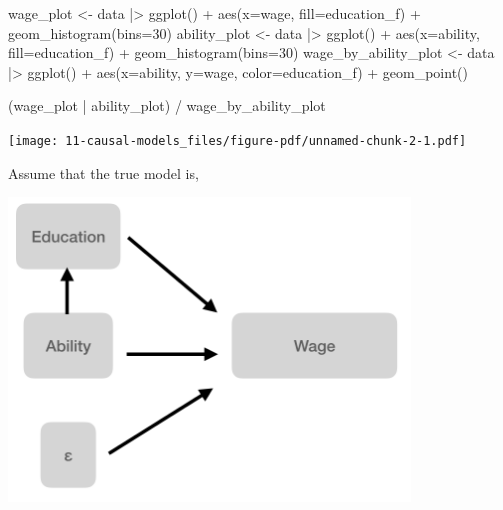 \documentclass[
  letterpaper,
  DIV=11,
  numbers=noendperiod]{scrreprt}
\newenvironment{Shaded}{\begin{snugshade}}{\end{snugshade}}
\newcommand{\AttributeTok}[1]{\textcolor[rgb]{0.40,0.45,0.13}{#1}}
\newcommand{\DecValTok}[1]{\textcolor[rgb]{0.68,0.00,0.00}{#1}}
\newcommand{\FunctionTok}[1]{\textcolor[rgb]{0.28,0.35,0.67}{#1}}
\newcommand{\NormalTok}[1]{\textcolor[rgb]{0.00,0.23,0.31}{#1}}
\newcommand{\OtherTok}[1]{\textcolor[rgb]{0.00,0.23,0.31}{#1}}
\newcommand{\SpecialCharTok}[1]{\textcolor[rgb]{0.37,0.37,0.37}{#1}}
\begin{document}
\begin{Shaded}
\begin{Highlighting}[]
\NormalTok{wage\_plot }\OtherTok{\textless{}{-}}\NormalTok{ data }\SpecialCharTok{|\textgreater{}}  
  \FunctionTok{ggplot}\NormalTok{() }\SpecialCharTok{+} 
  \FunctionTok{aes}\NormalTok{(}\AttributeTok{x=}\NormalTok{wage, }\AttributeTok{fill=}\NormalTok{education\_f) }\SpecialCharTok{+} 
  \FunctionTok{geom\_histogram}\NormalTok{(}\AttributeTok{bins=}\DecValTok{30}\NormalTok{)}
\NormalTok{ability\_plot }\OtherTok{\textless{}{-}}\NormalTok{ data }\SpecialCharTok{|\textgreater{}}  
  \FunctionTok{ggplot}\NormalTok{() }\SpecialCharTok{+} 
  \FunctionTok{aes}\NormalTok{(}\AttributeTok{x=}\NormalTok{ability, }\AttributeTok{fill=}\NormalTok{education\_f) }\SpecialCharTok{+} 
  \FunctionTok{geom\_histogram}\NormalTok{(}\AttributeTok{bins=}\DecValTok{30}\NormalTok{)}
\NormalTok{wage\_by\_ability\_plot }\OtherTok{\textless{}{-}}\NormalTok{ data }\SpecialCharTok{|\textgreater{}}  
  \FunctionTok{ggplot}\NormalTok{() }\SpecialCharTok{+} 
  \FunctionTok{aes}\NormalTok{(}\AttributeTok{x=}\NormalTok{ability, }\AttributeTok{y=}\NormalTok{wage, }\AttributeTok{color=}\NormalTok{education\_f) }\SpecialCharTok{+} 
  \FunctionTok{geom\_point}\NormalTok{()}
  

\NormalTok{(wage\_plot }\SpecialCharTok{|}\NormalTok{ ability\_plot) }\SpecialCharTok{/} 
\NormalTok{  wage\_by\_ability\_plot}
\end{Highlighting}
\end{Shaded}

\texttt{[image: 11-causal-models\_files/figure-pdf/unnamed-chunk-2-1.pdf]}

Assume that the true model is,

\includegraphics[width=0.8\textwidth,height=\textheight]{images/wage_system.png}
\end{document}
